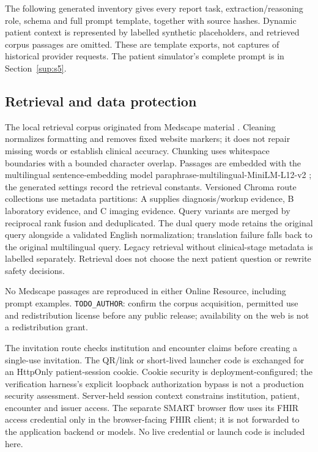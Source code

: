 The following generated inventory gives every report task, extraction/reasoning
role, schema and full prompt template, together with source hashes. Dynamic
patient context is represented by labelled synthetic placeholders, and retrieved
corpus passages are omitted. These are template exports, not captures of historical
provider requests. The patient simulator's complete prompt is in Section~\ref{sup:s5}.


\subsection{Retrieval and data protection}
The local retrieval corpus originated from Medscape material \citep{medscapeReference}. Cleaning normalizes
formatting and removes fixed website markers; it does not repair missing words or
establish clinical accuracy. Chunking uses whitespace boundaries with a bounded
character overlap. Passages are embedded with the multilingual sentence-embedding
model paraphrase-multilingual-MiniLM-L12-v2
\citep{reimersSbert2019,reimersMultilingual2020,multilingualMiniLM}; the generated
settings record the retrieval constants. Versioned Chroma \citep{chromaDb} route
collections use metadata partitions:
A supplies diagnosis/workup evidence, B laboratory evidence, and C imaging evidence.
Query variants are merged by reciprocal rank fusion \citep{cormackRrf2009} and deduplicated. The dual
query mode retains the original query alongside a validated English normalization;
translation failure falls back to the original multilingual query. Legacy retrieval
without clinical-stage metadata is labelled separately. Retrieval does not choose
the next patient question or rewrite safety decisions.

No Medscape passages are reproduced in either Online Resource, including prompt
examples. \texttt{TODO\_AUTHOR}: confirm the corpus acquisition, permitted use and
redistribution license before any public release; availability on the web is not
a redistribution grant.

The invitation route checks institution and encounter claims before creating a
single-use invitation. The QR/link or short-lived launcher code is exchanged for
an HttpOnly patient-session cookie. Cookie security is deployment-configured;
the verification harness's explicit loopback authorization bypass is not a production
security assessment. Server-held session context constrains institution, patient,
encounter and issuer access. The separate SMART browser flow uses its FHIR access
credential only in the browser-facing FHIR client; it is not forwarded to the
application backend or models. No live credential or launch code is included here.

